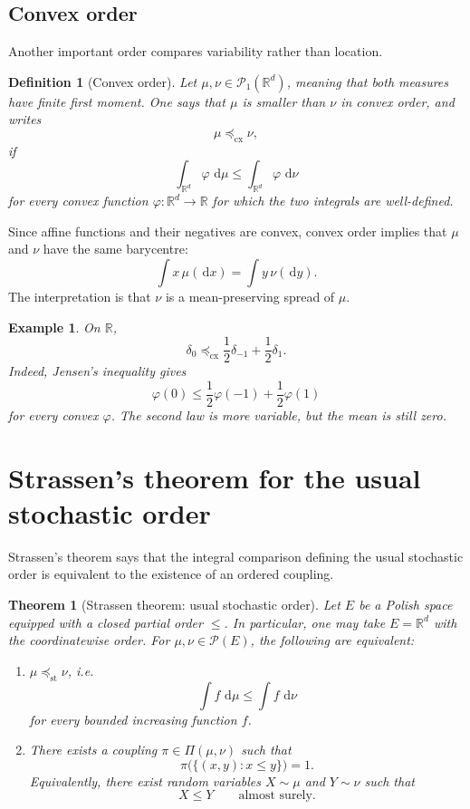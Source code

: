 \documentclass[11pt]{article}
\newtheorem{theorem}{Theorem}
\newtheorem{definition}{Definition}
\newtheorem{example}{Example}
\newcommand{\R}{\mathbb R}
\newcommand{\Pcal}{\mathcal P}
\newcommand{\dd}{\,\mathrm d}
\newcommand{\PiC}{\Pi}
\begin{document}
\subsection{Convex order}

Another important order compares variability rather than location.

\begin{definition}[Convex order]
Let \(\mu,\nu\in\Pcal_1(\R^d)\), meaning that both measures have finite first
moment. One says that \(\mu\) is smaller than \(\nu\) in convex order, and writes
\[
        \mu\preceq_{\mathrm{cx}}\nu,
\]
if
\[
        \int_{\R^d} \varphi\,\dd\mu
        \leq
        \int_{\R^d} \varphi\,\dd\nu
\]
for every convex function \(\varphi:\R^d\to\R\) for which the two integrals are
well-defined.
\end{definition}

Since affine functions and their negatives are convex, convex order implies
that \(\mu\) and \(\nu\) have the same barycentre:
\[
        \int x\,\mu(\dd x)
        =
        \int y\,\nu(\dd y).
\]
The interpretation is that \(\nu\) is a mean-preserving spread of \(\mu\).

\begin{example}
On \(\R\),
\[
        \delta_0
        \preceq_{\mathrm{cx}}
        \frac12\delta_{-1}+\frac12\delta_1.
\]
Indeed, Jensen's inequality gives
\[
        \varphi(0)
        \leq
        \frac12\varphi(-1)+\frac12\varphi(1)
\]
for every convex \(\varphi\). The second law is more variable, but the mean is
still zero.
\end{example}

\section{Strassen's theorem for the usual stochastic order}

Strassen's theorem says that the integral comparison defining the usual
stochastic order is equivalent to the existence of an ordered coupling.

\begin{theorem}[Strassen theorem: usual stochastic order]
Let \(E\) be a Polish space equipped with a closed partial order \(\leq\). In
particular, one may take \(E=\R^d\) with the coordinatewise order. For
\(\mu,\nu\in\Pcal(E)\), the following are equivalent:
\begin{enumerate}[label=\textup{(\roman*)}, leftmargin=2em]
    \item \(\mu\preceq_{\mathrm{st}}\nu\), i.e.
    \[
            \int f\,\dd\mu
            \leq
            \int f\,\dd\nu
    \]
    for every bounded increasing function \(f\).
    \item There exists a coupling \(\pi\in\PiC(\mu,\nu)\) such that
    \[
            \pi\bigl(\{(x,y):x\leq y\}\bigr)=1.
    \]
    Equivalently, there exist random variables \(X\sim\mu\) and \(Y\sim\nu\)
    such that
    \[
            X\leq Y
            \qquad\text{almost surely.}
    \]
\end{enumerate}
\end{theorem}
\end{document}
